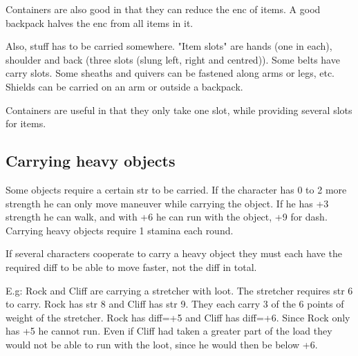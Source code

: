 
Containers are also good in that they can reduce the enc of items. A good backpack halves the enc from all items in it.

Also, stuff has to be carried somewhere. "Item slots" are hands (one in each), shoulder and back (three slots (slung left, right and centred)). Some belts have carry slots. Some sheaths and quivers can be fastened along arms or legs, etc. Shields can be carried on an arm or outside a backpack.

Containers are useful in that they only take one slot, while providing several slots for items.


\subsection*{Carrying heavy objects}
Some objects require a certain str to be carried. If the character has 0 to 2 more strength he can only move maneuver while carrying the object. If he has +3 strength he can walk, and with +6 he can run with the object, +9 for dash.
Carrying heavy objects require 1 stamina each round.

If several characters cooperate to carry a heavy object they must each have the required diff to be able to move faster, not the diff in total.

E.g: Rock and Cliff are carrying a stretcher with loot. The stretcher requires str 6 to carry. Rock has str 8 and Cliff has str 9. They each carry 3 of the 6 points of weight of the stretcher. Rock has diff=+5 and Cliff has diff=+6. Since Rock only has +5 he cannot run. Even if Cliff had taken a greater part of the load they would not be able to run with the loot, since he would then be below +6.














